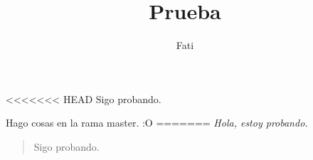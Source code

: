 \documentclass{article}
\begin{document}
\title{Prueba}
\author{Fati}
\maketitle

<<<<<<< HEAD
Sigo probando.

Hago cosas en la rama master. :O
=======
\emph{Hola, estoy probando.}

\begin{verse}
Sigo probando. 
\end{verse}
\end{document}
